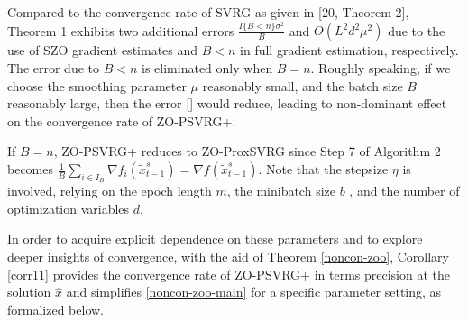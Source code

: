 \documentclass{article}
\theoremstyle{definition}
\theoremstyle{remark}
\begin{document}
{\color{Brown}
Compared to the convergence rate of SVRG as given in [20, Theorem 2], Theorem 1 exhibits two
additional errors $\frac{I\{B < n\}\sigma ^2}{B}$ and $O(L^2d^2\mu^2)$ due to the use of SZO gradient estimates and $B < n$ in full gradient estimation, respectively. The error due to $B < n$ is eliminated only when $B = n$. Roughly
speaking, if we choose the smoothing parameter $\mu$ reasonably small, and the batch size $B$ reasonably large, then the error \eqref{}
would reduce, leading to non-dominant effect on the convergence rate of ZO-PSVRG+. 

{\color{Brown}
If $B = n$, ZO-PSVRG+ reduces to ZO-ProxSVRG  since Step 7 of Algorithm 2 becomes
$\frac{1}{B}\sum_{i\in I_B} \nabla f_i(\widetilde{x}^s_{t-1}) = \nabla f(\widetilde{x}^s_{t-1})$. }
Note that the stepsize  $\eta$ is involved, relying on the epoch length $m$, the minibatch size $b$ , and the number of optimization variables $d$. 
}

{\color{Brown}
In order to acquire explicit dependence on these parameters and to explore deeper insights of convergence, with the aid of Theorem \ref{noncon-zoo}, Corollary \ref{corr11} provides the convergence rate of ZO-PSVRG+ in terms precision at the solution $\hat{x}$ and  simplifies \eqref{noncon-zoo-main} for a specific parameter setting, as formalized below.
}
\end{document}
